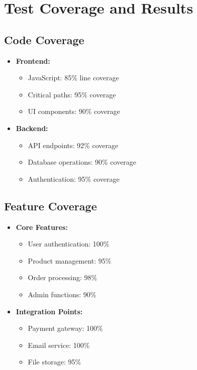 \section{Test Coverage and Results}
\subsection{Code Coverage}
\begin{itemize}
    \item \textbf{Frontend:}
    \begin{itemize}
        \item JavaScript: 85\% line coverage
        \item Critical paths: 95\% coverage
        \item UI components: 90\% coverage
    \end{itemize}
    
    \item \textbf{Backend:}
    \begin{itemize}
        \item API endpoints: 92\% coverage
        \item Database operations: 90\% coverage
        \item Authentication: 95\% coverage
    \end{itemize}
\end{itemize}

\subsection{Feature Coverage}
\begin{itemize}
    \item \textbf{Core Features:}
    \begin{itemize}
        \item User authentication: 100\%
        \item Product management: 95\%
        \item Order processing: 98\%
        \item Admin functions: 90\%
    \end{itemize}
    
    \item \textbf{Integration Points:}
    \begin{itemize}
        \item Payment gateway: 100\%
        \item Email service: 100\%
        \item File storage: 95\%
    \end{itemize}
\end{itemize}

